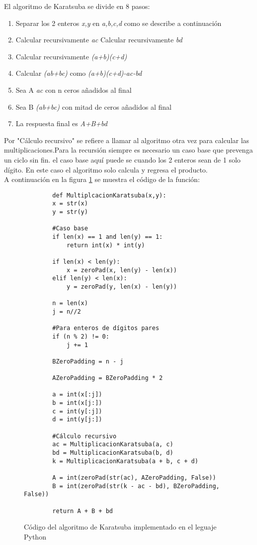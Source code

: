     El algoritmo de Karatsuba se divide en 8 pasos:
    \begin{enumerate}
        \item Separar los 2 enteros \textit{x,y} en \textit{a,b,c,d} como se describe a continuación
        \item Calcular recursivamente \textit{ac}
        \iem Calcular recursivamente \textit{bd}
        \item Calcular recursivamente \textit{(a+b)(c+d)}
        \item Calcular \textit{(ab+bc)} como \textit{(a+b)(c+d)-ac-bd}
        \item Sea A \textit{ac} con n ceros añadidos al final
        \item Sea B \textit{(ab+bc)} con mitad de ceros añadidos al final
        \item La respuesta final es \textit{A+B+bd}
    \end{enumerate}
    
    Por "Cálculo recursivo" se refiere a llamar al algoritmo otra vez para calcular las multiplicaciones.Para la recursión siempre es necesario un caso base que prevenga un ciclo sin fin. el caso base aquí puede se cuando los 2 enteros sean de 1 solo dígito. En este caso el algoritmo solo calcula y regresa el producto.\\
    
    A continuación en la figura \ref{CodigoKaratsuba} se muestra el código de la función:
    \begin{figure}[h!]
        \centering
    \begin{verbatim}
        def MultiplcacionKaratsuba(x,y):
        x = str(x)
        y = str(y)

        #Caso base
        if len(x) == 1 and len(y) == 1:
            return int(x) * int(y)

        if len(x) < len(y):
            x = zeroPad(x, len(y) - len(x))
        elif len(y) < len(x):
            y = zeroPad(y, len(x) - len(y))

        n = len(x)
        j = n//2
        
        #Para enteros de dígitos pares
        if (n % 2) != 0:
            j += 1    

        BZeroPadding = n - j

        AZeroPadding = BZeroPadding * 2

        a = int(x[:j])
        b = int(x[j:])
        c = int(y[:j])
        d = int(y[j:])

        #Cálculo recursivo
        ac = MultiplicacionKaratsuba(a, c)
        bd = MultiplicacionKaratsuba(b, d)
        k = MultiplicacionKaratsuba(a + b, c + d)

        A = int(zeroPad(str(ac), AZeroPadding, False))
        B = int(zeroPad(str(k - ac - bd), BZeroPadding, False))

        return A + B + bd
    \end{verbatim}
        \caption{Código del algoritmo de Karatsuba implementado en el leguaje Python}
        \label{CodigoKaratsuba}
    \end{figure}
    
